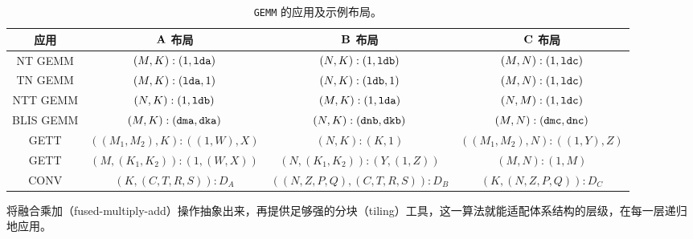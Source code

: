 \begin{table}[ht]
\centering
{\small
\begin{tabular}{|c|c|c|c|}
\textbf{应用} & $\mathbf{A}$ \textbf{布局} & $\mathbf{B}$ \textbf{布局} & $\mathbf{C}$ \textbf{布局} \\ \hline\hline
NT GEMM & $(M,K):(1,{\tt lda})$ & $(N,K):(1,{\tt ldb})$ & $(M,N):(1,{\tt ldc})$ \\ \hline
TN GEMM & $(M,K):({\tt lda},1)$ & $(N,K):({\tt ldb},1)$ & $(M,N):(1,{\tt ldc})$ \\ \hline
NTT GEMM & $(N,K):(1,{\tt ldb})$ & $(M,K):(1,{\tt lda})$ & $(N,M):(1,{\tt ldc})$ \\ \hline
BLIS GEMM & $(M,K):({\tt dma},{\tt dka})$ & $(N,K):({\tt dnb},{\tt dkb})$ & $(M,N):({\tt dmc},{\tt dnc})$ \\ \hline
GETT & $((M_1,M_2),K):((1,W),X)$ & $(N,K):(K,1)$ & $((M_1,M_2),N):((1,Y),Z)$ \\ \hline
GETT & $(M,(K_1,K_2)):(1,(W,X))$ & $(N,(K_1,K_2)):(Y,(1,Z))$ & $(M,N):(1,M)$ \\ \hline
CONV & $(K,(C,T,R,S)):D_A$ & $((N,Z,P,Q),(C,T,R,S)):D_B$ & $(K,(N,Z,P,Q)):D_C$ \\ \hline
\end{tabular}
\caption{{\tt GEMM} 的应用及示例布局。}
\label{tab:gemm}
}
\end{table}

将融合乘加（fused-multiply-add）操作抽象出来，再提供足够强的分块（tiling）工具，这一算法就能适配体系结构的层级，在每一层递归地应用。
